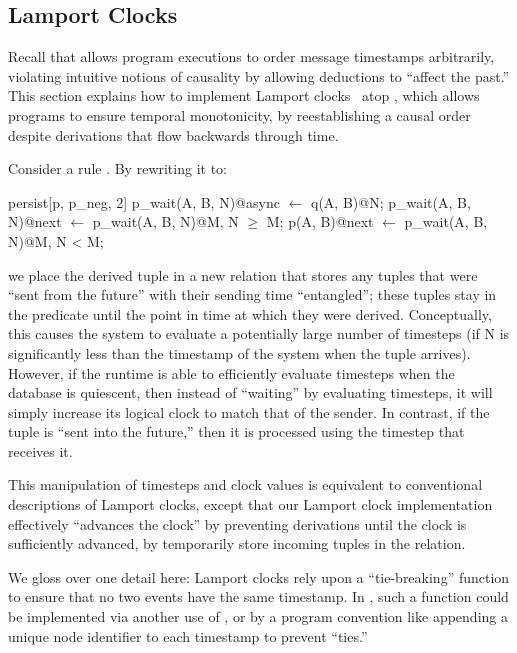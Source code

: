
\subsection{Lamport Clocks}
\label{sec:lamport}
Recall that \lang allows program executions to order message timestamps arbitrarily, violating intuitive notions of causality by allowing deductions to ``affect the past.''
This section explains how to implement Lamport
clocks~\cite{timeclocks} atop \lang, which allows programs to ensure
temporal monotonicity, by reestablishing a causal order
despite derivations that flow backwards through time.

Consider a rule .  By
rewriting it to:

\begin{Dedalus}
persist[p, p\_neg, 2]
p\_wait(A, B, N)@async \(\leftarrow\) q(A, B)@N;
p\_wait(A, B, N)@next \(\leftarrow\) p\_wait(A, B, N)@M, N \(\ge\) M;
p(A, B)@next \(\leftarrow\) p\_wait(A, B, N)@M, N < M;
\end{Dedalus}
\noindent
we place the derived tuple in a new relation  that
stores any tuples that were ``sent from the future'' with their sending time ``entangled''; these tuples stay in the  predicate  until the point in
time at which they were derived.  Conceptually, this causes the system
to evaluate a potentially large number of timesteps (if N is
significantly less than the timestamp of the system when the tuple
arrives).  However, if the runtime is able to efficiently evaluate
timesteps when the database is quiescent, then
instead of ``waiting'' by evaluating timesteps, it will simply
increase its logical clock to match that of the sender.  In contrast,
if the tuple is ``sent into the future,'' then it is processed using
the timestep that receives it.

This manipulation of timesteps and clock values is equivalent to
conventional descriptions of Lamport clocks, except that our Lamport
clock implementation effectively ``advances the clock'' by preventing derivations until the clock is sufficiently advanced, by temporarily store incoming tuples
in the  relation.

We gloss over one detail here: Lamport clocks rely
upon a ``tie-breaking'' function to ensure that no two events have the
same timestamp.  In \lang, such a function could be implemented via another use of , or by a program convention like
appending a unique node identifier to each timestamp to prevent ``ties.''

